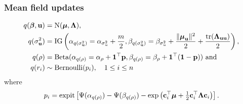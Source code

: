 \documentclass{beamer}
\begin{document}
\begin{frame}
	\frametitle{Mean field updates}
	\begin{align*}
		q({\boldsymbol \beta}, {\bf u})    & = \text{N}({\boldsymbol \mu}, {\boldsymbol \Lambda}),                                                                                                                                                                                 \\
		q(\sigma_{{\bf u}}^2) & = \text{IG}\left(\alpha_{q(\sigma_{{\bf u}}^2)} = \alpha_{\sigma_u^2} + \frac{m}{2}, \beta_{q(\sigma_{{\bf u}}^2)} = \beta_{\sigma_u^2} + \frac{\|{\boldsymbol \mu}_{\bf u}\|^2}{2} + \frac{\text{tr}({\boldsymbol \Lambda}_{{\bf u}{\bf u}})}{2}\right), \\
		q(\rho)           & = \text{Beta}(\alpha_{q(\rho)} = \alpha_\rho + {\bf 1}^\top {\bf p}, \beta_{q(\rho)} = \beta_\rho + {\bf 1}^\top({\bf 1} - {\bf p}))\text{ and}                                                                           \\
		q(r_i)            & \sim \text{Bernoulli} (p_i), \ \ \ 1 \leq i \leq n                                                                                                                                                         
	\end{align*}
	where
	$$
	p_i = \text{expit} \left [\Psi{(\alpha_{q(\rho)})} - \Psi{(\beta_{q(\rho)})} - \exp{\left({\bf c}_i^\top {\boldsymbol\mu}+  \tfrac{1}{2} {\bf c}_i^\top  {\boldsymbol\Lambda}{\bf c}_i\right)} \right ].
	$$
\end{frame}

\end{document}

